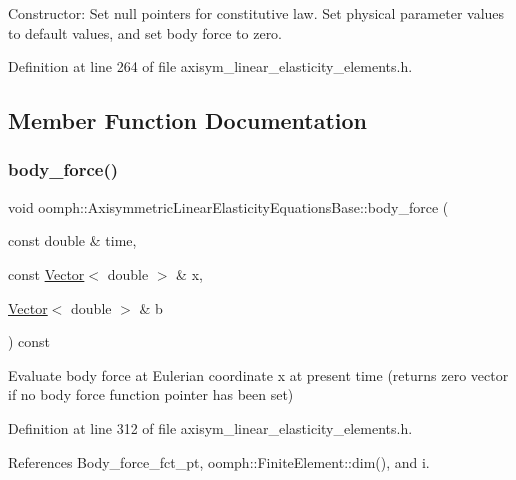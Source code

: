 Constructor\+: Set null pointers for constitutive law. Set physical parameter values to default values, and set body force to zero. 



Definition at line 264 of file axisym\+\_\+linear\+\_\+elasticity\+\_\+elements.\+h.



\subsection{Member Function Documentation}
\mbox{\label{classoomph_1_1AxisymmetricLinearElasticityEquationsBase_ad388a41f086f181a3c1608a5fb337ac6}} 
\subsubsection{\texorpdfstring{body\+\_\+force()}{body\_force()}}
{\footnotesize\ttfamily void oomph\+::\+Axisymmetric\+Linear\+Elasticity\+Equations\+Base\+::body\+\_\+force (\begin{DoxyParamCaption}\item[{const double \&}]{time,  }\item[{const \hyperlink{classoomph_1_1Vector}{Vector}$<$ double $>$ \&}]{x,  }\item[{\hyperlink{classoomph_1_1Vector}{Vector}$<$ double $>$ \&}]{b }\end{DoxyParamCaption}) const\hspace{0.3cm}{\ttfamily [inline]}}



Evaluate body force at Eulerian coordinate x at present time (returns zero vector if no body force function pointer has been set) 



Definition at line 312 of file axisym\+\_\+linear\+\_\+elasticity\+\_\+elements.\+h.



References Body\+\_\+force\+\_\+fct\+\_\+pt, oomph\+::\+Finite\+Element\+::dim(), and i.



